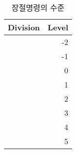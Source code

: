 \begin{table}
\centering
\caption{장절명령의 수준} \label{tab:seclevels}
\begin{tabular}{lr} \toprule
Division       & Level \\ \midrule
\cmd{\book}           & -2 \\
\cmd{\part}           & -1 \\
\cmd{\chapter}        & 0 \\
\cmd{\section}        & 1 \\
\cmd{\subsection}     & 2 \\
\cmd{\subsubsection}  & 3 \\
\cmd{\paragraph}      & 4 \\
\cmd{\subparagraph}   & 5 \\ \bottomrule
\end{tabular}
\end{table}

